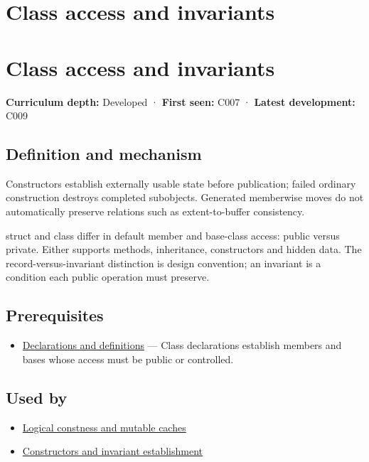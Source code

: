 \hypertarget{appendix-8e5214819615}{}
\section*{Class access and invariants}
\section{Class access and invariants}\label{appendix-8e5214819615-class-access-and-invariants}

\textbf{Curriculum depth:} Developed · \textbf{First seen:} C007 · \textbf{Latest development:} C009

\subsection{Definition and mechanism}\label{appendix-8e5214819615-definition-and-mechanism}

Constructors establish externally usable state before publication; failed ordinary construction destroys completed subobjects. Generated memberwise moves do not automatically preserve relations such as extent-to-buffer consistency.

struct and class differ in default member and base-class access: public versus private. Either supports methods, inheritance, constructors and hidden data. The record-versus-invariant distinction is design convention; an invariant is a condition each public operation must preserve.

\subsection{Prerequisites}\label{appendix-8e5214819615-prerequisites}

\begin{itemize}
\tightlist
\item
  \hyperref[appendix-2e4d494c2d94]{Declarations and definitions} --- Class declarations establish members and bases whose access must be public or controlled.
\end{itemize}

\subsection{Used by}\label{appendix-8e5214819615-used-by}

\begin{itemize}
\tightlist
\item
  \hyperref[appendix-f5593256bcaf]{Logical constness and mutable caches}
\item
  \hyperref[appendix-7f8ec83d0886]{Constructors and invariant establishment}
\end{itemize}

